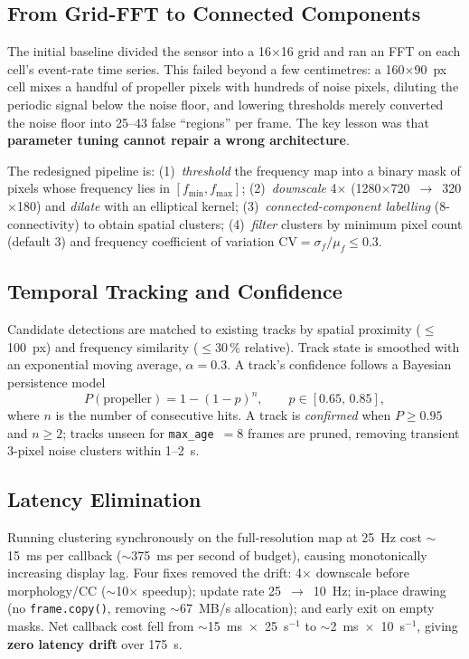 \documentclass[conference]{IEEEtran}
\begin{document}
\subsection{From Grid-FFT to Connected Components}
The initial baseline divided the sensor into a 16$\times$16 grid and ran an
FFT on each cell's event-rate time series. This failed beyond a few
centimetres: a 160$\times$90~px cell mixes a handful of propeller pixels with
hundreds of noise pixels, diluting the periodic signal below the noise floor,
and lowering thresholds merely converted the noise floor into 25--43 false
``regions'' per frame. The key lesson was that \textbf{parameter tuning cannot
repair a wrong architecture}.

The redesigned pipeline is: (1)~\emph{threshold} the frequency map into a
binary mask of pixels whose frequency lies in $[f_{\min}, f_{\max}]$;
(2)~\emph{downscale} 4$\times$ (1280$\times$720~$\rightarrow$~320$\times$180)
and \emph{dilate} with an elliptical kernel; (3)~\emph{connected-component
labelling} (8-connectivity) to obtain spatial clusters; (4)~\emph{filter}
clusters by minimum pixel count (default 3) and frequency coefficient of
variation $\mathrm{CV}=\sigma_f/\mu_f \le 0.3$.

\subsection{Temporal Tracking and Confidence}
Candidate detections are matched to existing tracks by spatial proximity
($\le$100~px) and frequency similarity ($\le$30\,\% relative). Track state is
smoothed with an exponential moving average, $\alpha=0.3$. A track's
confidence follows a Bayesian persistence model
\begin{equation}
P(\text{propeller}) = 1 - (1-p)^{n}, \qquad p\in[0.65,\,0.85],
\end{equation}
where $n$ is the number of consecutive hits. A track is \emph{confirmed} when
$P\ge 0.95$ and $n\ge 2$; tracks unseen for \texttt{max\_age}~$=8$ frames are
pruned, removing transient 3-pixel noise clusters within 1--2~s.

\subsection{Latency Elimination}
Running clustering synchronously on the full-resolution map at 25~Hz cost
$\sim$15~ms per callback ($\sim$375~ms per second of budget), causing
monotonically increasing display lag. Four fixes removed the drift:
4$\times$ downscale before morphology/CC ($\sim$10$\times$ speedup); update
rate 25~$\rightarrow$~10~Hz; in-place drawing (no \texttt{frame.copy()},
removing $\sim$67~MB/s allocation); and early exit on empty masks. Net
callback cost fell from $\sim$15~ms~$\times$~25~s$^{-1}$ to
$\sim$2~ms~$\times$~10~s$^{-1}$, giving \textbf{zero latency drift} over 175~s.
\end{document}

